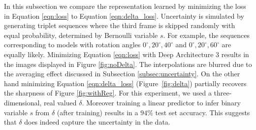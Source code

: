In this subsection we compare the representation learned by minimizing the loss in Equation \ref{eqn:loss} to Equation \ref{eqn:delta_loss}. Uncertainty is simulated by generating triplet sequences where the third frame is skipped randomly with equal probability, determined by Bernoulli variable $s$. For example, the sequences corresponding to models with rotation angles $0^{\circ}, 20^{\circ}, 40^{\circ}$ and $0^{\circ}, 20^{\circ}, 60^{\circ}$ are equally likely. Minimizing Equation \ref{eqn:loss} with Deep Architecture 3 results in the images displayed in Figure \ref{fig:noDelta}. The interpolations are blurred due to the averaging effect discussed in Subsection \ref{subsec:uncertainty}. On the other hand minimizing Equation \ref{eqn:delta_loss} (Figure~\ref{fig:delta}) partially recovers the sharpness of Figure \ref{fig:withReg}. For this experiment, we used a three-dimensional, real valued $\delta$. Moreover training a linear predictor to infer binary variable $s$ from $\delta$ (after training) results in a $94\%$ test set accuracy. This suggests that $\delta$ does indeed capture the uncertainty in the data.

